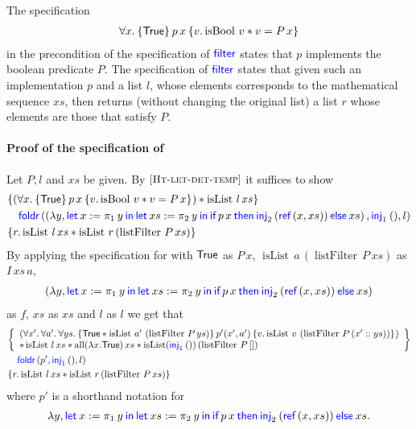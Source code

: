 The specification
\begin{align*}
  \All x. \hoare{\TRUE}{p \, x}{v. \operatorname{isBool} \, v \ast v = P \, x}
\end{align*}
in the precondition of the specification of $\textsf{\color{blue} filter}$ states that $p$ implements the boolean predicate $P$.
The specification of $\textsf{\color{blue} filter}$ states that given such an implementation $p$ and a list $l$, whose elements corresponds to the mathematical sequence $xs$, then  returns (without changing the original list) a list $r$ whose elements are those that satisfy $P$.

\paragraph*{Proof of the specification of }
Let $P, l$ and $xs$ be given. By $\ruleref{Ht-let-det-temp}$ it suffices to show
\begin{align*}
\hoareV{ \left( \All x. \hoare{\TRUE}{p \, x}{v. \operatorname{isBool} \, v \ast v = P \, x}\right)
\ast \operatorname{isList} \, l\, xs }
{\langkw{foldr}\left(\left( \lambda y, \Let x = \Proj{1} y in \Let xs = \Proj{2} y in \If {p\, x} then \Inj{2} (\Ref (x, xs) ) \Else  xs\right), \Inj{1}(), l\right)}{r.  \operatorname{isList} \, l\, xs \ast \operatorname{isList} \, r \left( \operatorname{listFilter} \, P \, xs \right)}
 \end{align*}
  By applying the specification for  with $\textsf{\upshape True}$ as $P \, x $, $\operatorname{isList} \, a  \, \left( \operatorname{listFilter} \, P \, xs \right) $ as $I \, xs \, a $,
  \begin{align*}
    \left( \lambda y, \Let x = \Proj{1} y in \Let xs = \Proj{2} y in \If {p\, x} then \Inj{2} (\Ref (x, xs) ) \Else  xs \right)
  \end{align*}
  as $f$, $xs$ as $xs$ and $l$ as $l$ we get that
 \begin{align*}
\hoareV{ \begin{array}{l}
\left(  \All x'. \All a'. \All ys. \hoare {\TRUE \ast \operatorname{isList} \, a'  \, \left( \operatorname{listFilter} \, P \, ys \right)}{p' (x', a')}{v. \operatorname{isList} \, v \, \left( \operatorname{listFilter} \, P \, (x'::ys) \right) }
\right) \\
\ast \operatorname{isList} \, l\, xs \ast \operatorname{all} (\lambda x . \TRUE) \, xs \ast \operatorname{isList}(\Inj{1}())\, (\operatorname{listFilter} \, P \, []) \end{array}}
{\langkw{foldr}\left(p', \Inj{1}(), l\right)}{r.  \operatorname{isList} \, l\, xs \ast \operatorname{isList} \, r \left( \operatorname{listFilter} \, P \, xs \right)}
 \end{align*}
 where $p'$ is a shorthand notation for
 \begin{align*}
   \lambda y, \Let x = \Proj{1} y in \Let xs = \Proj{2} y in \If {p\, x} then \Inj{2} (\Ref (x, xs) ) \Else  xs.
 \end{align*}
 

